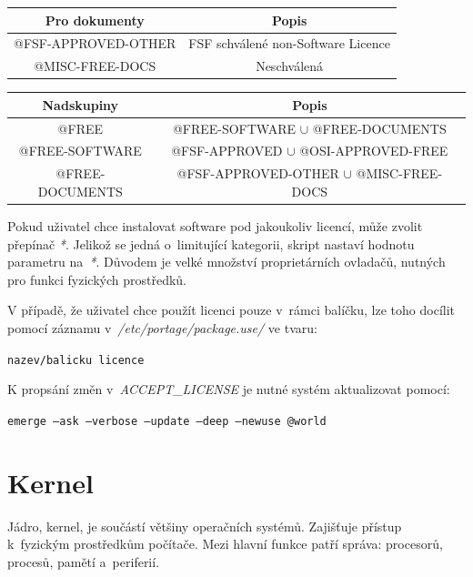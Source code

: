\documentclass[12pt,a4paper,twoside,]{article}
\begin{document}
{{{{{{{\begin{table}[h]
\begin{tabular}{|c|c|c|}
	\end{tabular}
\end{table}
\begin{table}[h]
	\centering
	\begin{tabular}{|c|c|}
		\hline
		Pro dokumenty & Popis \\
		\hline
		@FSF-APPROVED-OTHER & FSF schválené non-Software Licence \\
		\hline
		@MISC-FREE-DOCS & Neschválená \\
		\hline
	\end{tabular}
\end{table}
\begin{table}[h]
	\centering
	\begin{tabular}{|c|c|}
	\hline
	Nadskupiny & Popis \\
	\hline
	@FREE & @FREE-SOFTWARE $\cup$ @FREE-DOCUMENTS \\
	\hline
	@FREE-SOFTWARE & @FSF-APPROVED $\cup$ @OSI-APPROVED-FREE\\
	\hline
	@FREE-DOCUMENTS & @FSF-APPROVED-OTHER $\cup$ @MISC-FREE-DOCS\\
	\hline
	\end{tabular}
\end{table}
\hspace{-1.5em}Pokud uživatel chce instalovat software pod jakoukoliv licencí, může zvolit přepínač \textit{*}.
Jelikož se jedná o~limitující kategorii, skript nastaví hodnotu parametru na~\textit{*}. Důvodem je velké množství proprietárních ovladačů, nutných pro funkci fyzických prostředků.


\hspace*{-1.5em}V případě, že uživatel chce použít licenci pouze v~rámci balíčku, lze toho docílit pomocí záznamu v~\textit{/etc/portage/package.use/} ve tvaru:

\texttt{nazev/balicku licence}

\hspace{-1.5em}K propsání změn v~\textit{ACCEPT\_LICENSE} je nutné systém aktualizovat pomocí:

\texttt{emerge --ask --verbose --update --deep --newuse @world}


\newpage

\section{\textsf{Kernel}}\hypertarget{Kernel}{}
Jádro, kernel, je součástí většiny operačních systémů. Zajišťuje přístup k~fyzickým prostředkům počítače. Mezi hlavní funkce patří správa: procesorů, procesů, pamětí a~periferií. 

}}}}}}}
\end{document}
